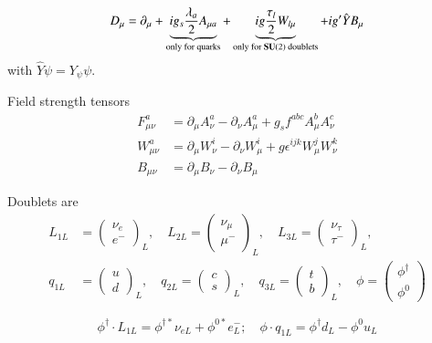 \begin{equation}
   D_\mu = \partial_\mu + \underbrace{i g_s \frac{\lambda_a}{2} A_{\mu a}}_{\text{only for quarks}} + \underbrace{i g \frac{\tau_l}{2} W_{l \mu}}_{\text{only for $\mathbf{SU}(2)$ doublets}} + i g' \hat{Y} B_\mu \label{0.15}
\end{equation}
with $\hat {Y} \psi = Y_\psi \psi$.

Field strength tensors
\begin{align}
   F_{\mu\nu}^a &= \partial_\mu A^a_\nu - \partial_\nu A_\mu^a + g_s f^{abc} A_\mu^b A_\nu^c \label{0.15} \\
   W_{\mu\nu}^a &= \partial_\mu W_\nu^i - \partial_\nu W_\mu^i + g \epsilon^{ijk} W_\mu^j W_\nu^k \label{0.16} \\
   B_{\mu\nu} &= \partial_\mu B_\nu - \partial_\nu B_\mu \label{0.17}
\end{align}

Doublets are
\begin{equation}
   \begin{split}
      L_{1L} &= \begin{pmatrix} \nu_e \\ e^- \end{pmatrix}_L, \quad L_{2L} = \begin{pmatrix} \nu_\mu \\ \mu^- \end{pmatrix}_L, \quad L_{3L} = \begin{pmatrix} \nu_\tau \\ \tau^- \end{pmatrix}_L, \\
      q_{1L} &= \begin{pmatrix} u \\ d \end{pmatrix}_L, \quad q_{2L} = \begin{pmatrix} c \\ s\end{pmatrix}_L, \quad q_{3L} = \begin{pmatrix} t \\ b\end{pmatrix}_L, \quad \phi = \begin{pmatrix} \phi^\dagger \\ \phi^0 \end{pmatrix}
   \end{split}
   \label{0.18}
\end{equation}

\begin{equation}
   \phi^\dagger \cdot L_{1L} = \phi^{\dagger *} \nu_{eL} + \phi^{0 *} e^-_L; \quad \phi \cdot q_{1L} = \phi^\dagger d_L - \phi^0 u_L \label{0.19}
\end{equation}
